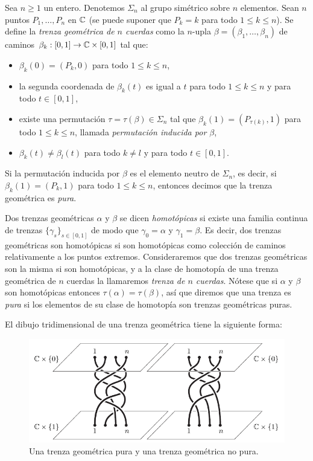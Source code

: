 \documentclass[TFG.tex]{subfiles}
\begin{document}
\begin{defi}\label{geo}
Sea $n\geq 1$ un entero. Denotemos $\Sigma_n$ al grupo simétrico sobre $n$ elementos. Sean $n$ puntos $P_1,\dots, P_n$ en $\mathbb{C}$ (se puede suponer que $P_k=k$ para todo $1\leq k\leq n$). Se define la \emph{trenza geométrica de $n$ cuerdas} como la $n$-upla $\beta=(\beta_1,\dots,\beta_n)$ de caminos $\beta_k:[0,1]\to\mathbb{C}\times[0,1]$ tal que:
\begin{itemize}
\item $\beta_k(0)=(P_k,0)$ para todo $1\leq k\leq n$,
\item la segunda coordenada de $\beta_k(t)$ es igual a $t$ para todo $1\leq k\leq n$ y para todo $t\in [0,1]$,
\item existe una permutación $\tau=\tau(\beta)\in\Sigma_n$ tal que $\beta_k(1)=(P_{\tau(k)},1)$ para todo $1\leq k\leq n$, llamada \emph{permutación inducida por $\beta$},
\item $\beta_k(t)\neq \beta_l(t)$ para todo $k\neq l$ y para todo $t\in[0,1]$.
\end{itemize}
Si la permutación inducida por $\beta$ es el elemento neutro de $\Sigma_n$, es decir, si $\beta_k(1)=(P_k,1)$ para todo $1\leq k\leq n$, entonces decimos que la trenza geométrica es \emph{pura}.

Dos trenzas geométricas $\alpha$ y $\beta$ se dicen \emph{homotópicas} si existe una familia continua de trenzas $\{\gamma_s\}_{s\in[0,1]}$ de modo que $\gamma_0=\alpha$ y $\gamma_1=\beta$. Es decir, dos trenzas geométricas son homotópicas si son homotópicas como colección de caminos relativamente a los puntos extremos. Consideraremos que dos trenzas geométricas son la misma si son homotópicas, y a la clase de homotopía de una trenza geométrica de $n$ cuerdas la llamaremos \emph{trenza de $n$ cuerdas}. Nótese que si $\alpha$ y $\beta$ son homotópicas entonces $\tau(\alpha)=\tau(\beta)$, así que diremos que una trenza es \emph{pura} si los elementos de su clase de homotopía son trenzas geométricas puras.
\end{defi}

El dibujo tridimensional de una trenza geométrica tiene la siguiente forma:
\begin{figure}[h!]
\includegraphics[scale=0.7]{Imagenes/hilos}
\caption{Una trenza geométrica pura y una trenza geométrica no pura.}\label{hilos}
\end{figure}
\end{document}
